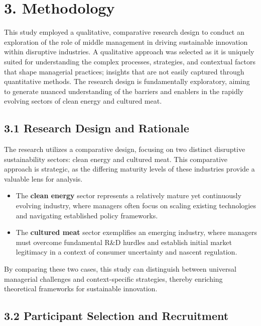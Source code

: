 \section*{3. Methodology}

This study employed a qualitative, comparative research design to conduct an exploration of the role of middle management in driving sustainable innovation within disruptive industries. A qualitative approach was selected as it is uniquely suited for understanding the complex processes, strategies, and contextual factors that shape managerial practices; insights that are not easily captured through quantitative methods. The research design is fundamentally exploratory, aiming to generate nuanced understanding of the barriers and enablers in the rapidly evolving sectors of clean energy and cultured meat.

\subsection*{3.1 Research Design and Rationale}

The research utilizes a comparative design, focusing on two distinct disruptive sustainability sectors: clean energy and cultured meat. This comparative approach is strategic, as the differing maturity levels of these industries provide a valuable lens for analysis. 
\begin{itemize}
	\item The \textbf{clean energy} sector represents a relatively mature yet continuously evolving industry, where managers often focus on scaling existing technologies and navigating established policy frameworks.
	\item The \textbf{cultured meat} sector exemplifies an emerging industry, where managers must overcome fundamental R\&D hurdles and establish initial market legitimacy in a context of consumer uncertainty and nascent regulation.
\end{itemize}
By comparing these two cases, this study can distinguish between universal managerial challenges and context-specific strategies, thereby enriching theoretical frameworks for sustainable innovation.

\subsection*{3.2 Participant Selection and Recruitment}

